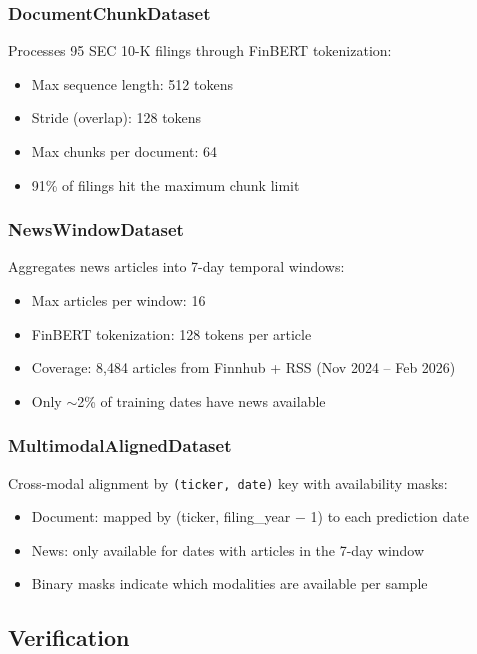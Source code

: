 \documentclass[12pt,a4paper]{article}
\begin{document}
\subsubsection{DocumentChunkDataset}

Processes 95 SEC 10-K filings through FinBERT tokenization:
\begin{itemize}[noitemsep]
    \item Max sequence length: 512 tokens
    \item Stride (overlap): 128 tokens
    \item Max chunks per document: 64
    \item 91\% of filings hit the maximum chunk limit
\end{itemize}

\subsubsection{NewsWindowDataset}

Aggregates news articles into 7-day temporal windows:
\begin{itemize}[noitemsep]
    \item Max articles per window: 16
    \item FinBERT tokenization: 128 tokens per article
    \item Coverage: 8,484 articles from Finnhub + RSS (Nov 2024 -- Feb 2026)
    \item Only $\sim$2\% of training dates have news available
\end{itemize}

\subsubsection{MultimodalAlignedDataset}

Cross-modal alignment by \texttt{(ticker, date)} key with availability masks:
\begin{itemize}[noitemsep]
    \item Document: mapped by (ticker, filing\_year $-$ 1) to each prediction date
    \item News: only available for dates with articles in the 7-day window
    \item Binary masks indicate which modalities are available per sample
\end{itemize}

\subsection{Verification}
\end{document}
